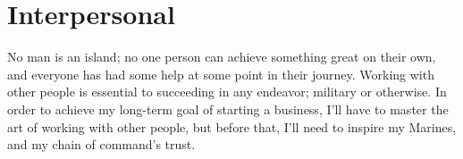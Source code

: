 \section{Interpersonal}

No man is an island; no one person can achieve something great on their own, and everyone has
had some help at some point in their journey. Working with other people is essential to succeeding in
any endeavor; military or otherwise. In order to achieve my long-term goal of starting a business,
I'll have to master the art of working with other people, but before that, I'll need to inspire my
Marines, and my chain of command's trust.

\begin{itemize}
\end{itemize}








